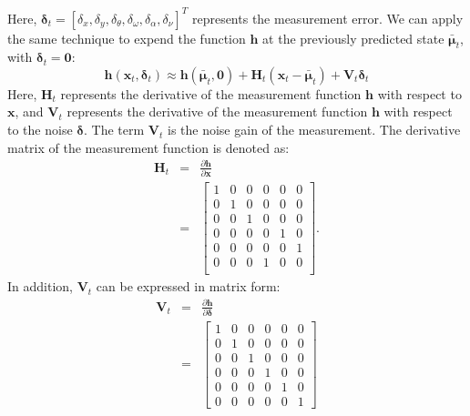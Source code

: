 \documentclass[12pt, a4paper]{article}
\begin{document}
Here, $\bm{\delta}_{t}=[\delta_{x}, \delta_{y}, \delta_{\theta}, \delta_{\omega}, \delta_{\alpha}, \delta_{\nu}]^{T}$ represents the measurement error. We can apply the same technique to expend the function $\bm{h}$ at the previously predicted state $\bar{\bm{\mu}}_{t}$, with $\bm{\delta}_{t}=\bm{0}$:
\[
  \bm{h}(\bm{x}_{t},\bm{\delta}_{t}) \approx \bm{h}(\bar{\bm{\mu}}_{t}, \bm{0}) + \bm{H}_{t}(\bm{x}_{t}-\bar{\bm{\mu}}_{t}) + \bm{V}_{t}\bm{\delta}_{t}
\]
Here, $\bm{H}_{t}$ represents the derivative of the measurement function $\bm{h}$ with respect to $\bm{x}$, and $\bm{V}_{t}$ represents the derivative of the measurement function $\bm{h}$ with respect to the noise $\bm{\delta}$. The term $\bm{V}_{t}$ is the noise gain of the measurement. The derivative matrix of the measurement function is denoted as:
\begin{eqnarray*}
  \bm{H}_{t} & = & \frac{\partial\bm{h}}{\partial{\bm{x}}}\\ 
  & = & \begin{bmatrix}
    1 & 0 & 0 & 0 & 0 & 0\\
    0 & 1 & 0 & 0 & 0 & 0\\
    0 & 0 & 1 & 0 & 0 & 0\\
    0 & 0 & 0 & 0 & 1 & 0\\
    0 & 0 & 0 & 0 & 0 & 1\\
    0 & 0 & 0 & 1 & 0 & 0\\
  \end{bmatrix}.
\end{eqnarray*}
In addition, $\bm{V}_{t}$ can be expressed in matrix form:
\begin{eqnarray*}
  \bm{V}_{t} & = & \frac{\partial \bm{h}}{\partial \bm{\delta}}\\
  & = & \begin{bmatrix}
    1 & 0 & 0 & 0 & 0 & 0\\
    0 & 1 & 0 & 0 & 0 & 0\\
    0 & 0 & 1 & 0 & 0 & 0\\
    0 & 0 & 0 & 1 & 0 & 0\\
    0 & 0 & 0 & 0 & 1 & 0\\
    0 & 0 & 0 & 0 & 0 & 1
  \end{bmatrix}
\end{eqnarray*}
\end{document}
